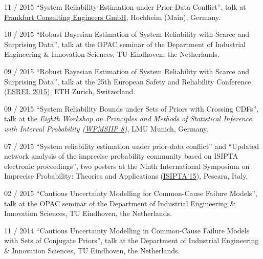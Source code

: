 \documentclass[a4paper]{simplecv}
\begin{document}
\begin{topic}
\item[11 / 2015] ``System Reliability Estimation under Prior-Data Conflict'', talk at %
                 \href{http://frankfurt-consulting.de/}{Frankfurt Consulting Engineers GmbH},
                 Hochheim (Main), Germany.

\item[10 / 2015] ``Robust Bayesian Estimation of System Reliability with Scarce and Surprising Data'', talk at
                 the OPAC seminar of
                 the Department of Industrial Engineering \& Innovation Sciences, TU Eindhoven, the Netherlands.

\item[09 / 2015] ``Robust Bayesian Estimation of System Reliability with Scarce and Surprising Data'', talk at %
                 the 25th European Safety and Reliability Conference
                 (\href{http://esrel2015.ethz.ch/}{ESREL 2015}),
                 ETH Zurich, Switzerland.

\item[09 / 2015] ``System Reliability Bounds under Sets of Priors with Crossing CDFs'', talk at the %
                 \emph{Eighth Workshop on Principles and Methods of Statistical Inference with Interval Probability (\href{http://www.statistik.lmu.de/wpmsiip_2015/index.html}{WPMSIIP 8})},
                 LMU Munich, Germany.

\item[07 / 2015] ``System reliability estimation under prior-data conflict'' and
                 ``Updated network analysis of the imprecise probability community based on ISIPTA electronic proceedings'',
                 two posters at the
                 Ninth International Symposium on Imprecise Probability: Theories and Applications
                 (\href{http://www.sipta.org/isipta15/}{ISIPTA'15}),
                 Pescara, Italy.

\item[02 / 2015] ``Cautious Uncertainty Modelling for Common-Cause Failure Models'', talk at the OPAC seminar of %
                 the Department of Industrial Engineering \& Innovation Sciences, TU Eindhoven, the Netherlands.

\item[11 / 2014] ``Cautious Uncertainty Modelling in Common-Cause Failure Models with Sets of Conjugate Priors'', talk at
                 the Department of Industrial Engineering \& Innovation Sciences, TU Eindhoven, the Netherlands.


\end{topic}
\end{document}
